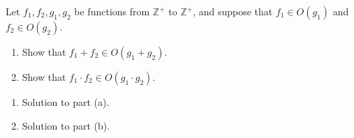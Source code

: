 \documentclass{article}
\begin{document}
\begin{question}
Let $f_1, f_2, g_1, g_2$ be functions from $\mathbb Z^+$ to $\mathbb Z^+$, and suppose that $f_1 \in O(g_1)$ and $f_2 \in O(g_2)$.

\begin{enumerate}[label = (\alph*)]
    \item Show that $f_1 + f_2 \in O(g_1 + g_2)$.
    \item Show that $f_1 \cdot f_2 \in O(g_1 \cdot g_2)$.
\end{enumerate}
\end{question}

\begin{solution}
\begin{enumerate}[label = (\alph*)]
    \item Solution to part (a).

    \item Solution to part (b).
\end{enumerate}
\end{solution}
\end{document}
